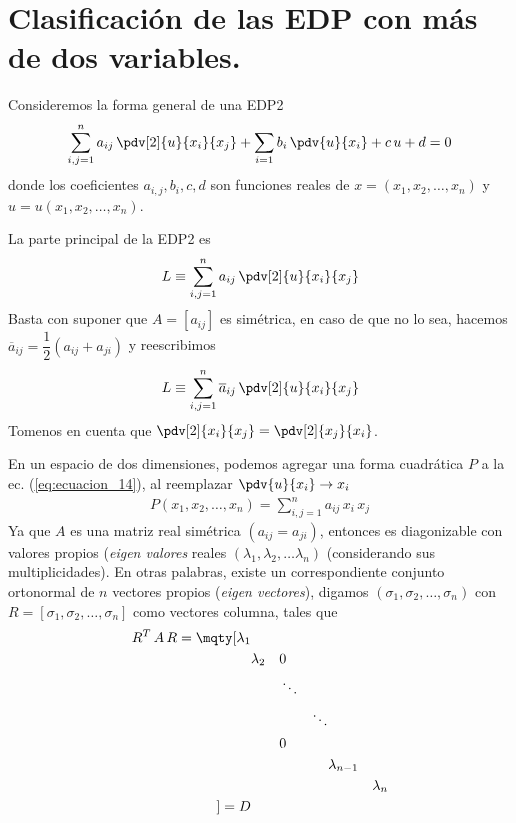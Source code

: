 \section{Clasificación de las EDP con más de dos variables.}
Consideremos la forma general de una EDP2
\begin{align}
\sum_{i,j=1}^{n} a_{ij} \, \pdv[2]{u}{x_{i}}{x_{j}} + \sum_{i=1} b_{i} \, \pdv{u}{x_{i}} + c \, u + d = 0
\label{eq:ecuacion_12}    
\end{align}
donde los coeficientes $a_{i,j}, b_{i}, c, d$ son funciones reales de $x = (x_{1}, x_{2}, \ldots, x_{n})$ y $u = u(x_{1}, x_{2}, \ldots, x_{n})$.
\par
La parte principal de la EDP2 es
\begin{align}
L \equiv \sum_{i, j=1}^{n} a_{ij} \, \pdv[2]{u}{x_{i}}{x_{j}}
\label{eq:ecuacion_13}    
\end{align}
Basta con suponer que $A = [a_{ij}]$ es simétrica, en caso de que no  lo sea, hacemos $\overline{a}_{ij} = \dfrac{1}{2} (a_{ij} + a_{ji})$ y reescribimos
\begin{align}
L \equiv \sum_{i, j=1}^{n} \overline{a}_{ij} \, \pdv[2]{u}{x_{i}}{x_{j}}
\label{eq:ecuacion_14}    
\end{align}
Tomenos en cuenta que $\displaystyle \pdv[2]{x_{i}}{x_{j}} = \pdv[2]{x_{j}}{x_{i}}$. 
\par
En un espacio de dos dimensiones, podemos agregar una forma cuadrática $P$ a la ec. (\ref{eq:ecuacion_14}), al reemplazar $\displaystyle \pdv{u}{x_{i}} \to x_{i}$
\begin{align}
P(x_{1}, x_{2},\ldots, x_{n}) = \sum_{i,j=1}^{n} a_{ij} \, x_{i} \, x_{j}
\label{eq:ecuacion_015}
\end{align}
Ya que $A$ es una matriz real simétrica $(a_{ij} = a_{ji})$, entonces es diagonizable con valores propios (\emph{eigen valores} reales $(\lambda_{1}, \lambda_{2}, \ldots \lambda_{n})$ (considerando sus multiplicidades). En otras palabras, existe un correspondiente conjunto ortonormal de $n$ vectores propios (\emph{eigen vectores}), digamos $(\sigma_{1}, \sigma_{2}, \ldots, \sigma_{n})$ con $R = [\sigma_{1}, \sigma_{2}, \ldots, \sigma_{n}]$ como vectores columna, tales que
\begin{align}
R^{T} \, A \, R =
\mqty[
\lambda_{1} & & & & & & \\
& \lambda_{2} & & 0 & & & \\
& & & \ddots & &  & \\
& & & &\ddots & & \\
& & & 0 & & & \\
&  & &  & & \lambda_{n-1} & \\
&  & &  & & & \lambda_{n} \\
] = D
\label{eq:ecuacion_16}    
\end{align}
